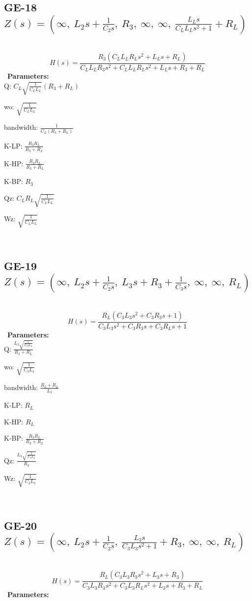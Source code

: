 \documentclass{article}
\begin{document}
\subsection{GE-18 $Z(s) = \left( \infty, \  L_{2} s + \frac{1}{C_{2} s}, \  R_{3}, \  \infty, \  \infty, \  \frac{L_{L} s}{C_{L} L_{L} s^{2} + 1} + R_{L}\right)$ } \ 
\textbf{\[H(s) = \frac{R_{3} \left(C_{L} L_{L} R_{L} s^{2} + L_{L} s + R_{L}\right)}{C_{L} L_{L} R_{3} s^{2} + C_{L} L_{L} R_{L} s^{2} + L_{L} s + R_{3} + R_{L}}\] } \ 
\textbf{Parameters:}\\ 

Q: $C_{L} \sqrt{\frac{1}{C_{L} L_{L}}} \left(R_{3} + R_{L}\right)$\ 

wo: $\sqrt{\frac{1}{C_{L} L_{L}}}$\ 

bandwidth: $\frac{1}{C_{L} \left(R_{3} + R_{L}\right)}$\ 

K-LP: $\frac{R_{3} R_{L}}{R_{3} + R_{L}}$\ 

K-HP: $\frac{R_{3} R_{L}}{R_{3} + R_{L}}$\ 

K-BP: $R_{3}$\ 

Qz: $C_{L} R_{L} \sqrt{\frac{1}{C_{L} L_{L}}}$\ 

Wz: $\sqrt{\frac{1}{C_{L} L_{L}}}$\ 

\ 

\subsection{GE-19 $Z(s) = \left( \infty, \  L_{2} s + \frac{1}{C_{2} s}, \  L_{3} s + R_{3} + \frac{1}{C_{3} s}, \  \infty, \  \infty, \  R_{L}\right)$ } \ 
\textbf{\[H(s) = \frac{R_{L} \left(C_{3} L_{3} s^{2} + C_{3} R_{3} s + 1\right)}{C_{3} L_{3} s^{2} + C_{3} R_{3} s + C_{3} R_{L} s + 1}\] } \ 
\textbf{Parameters:}\\ 

Q: $\frac{L_{3} \sqrt{\frac{1}{C_{3} L_{3}}}}{R_{3} + R_{L}}$\ 

wo: $\sqrt{\frac{1}{C_{3} L_{3}}}$\ 

bandwidth: $\frac{R_{3} + R_{L}}{L_{3}}$\ 

K-LP: $R_{L}$\ 

K-HP: $R_{L}$\ 

K-BP: $\frac{R_{3} R_{L}}{R_{3} + R_{L}}$\ 

Qz: $\frac{L_{3} \sqrt{\frac{1}{C_{3} L_{3}}}}{R_{3}}$\ 

Wz: $\sqrt{\frac{1}{C_{3} L_{3}}}$\ 

\ 

\subsection{GE-20 $Z(s) = \left( \infty, \  L_{2} s + \frac{1}{C_{2} s}, \  \frac{L_{3} s}{C_{3} L_{3} s^{2} + 1} + R_{3}, \  \infty, \  \infty, \  R_{L}\right)$ } \ 
\textbf{\[H(s) = \frac{R_{L} \left(C_{3} L_{3} R_{3} s^{2} + L_{3} s + R_{3}\right)}{C_{3} L_{3} R_{3} s^{2} + C_{3} L_{3} R_{L} s^{2} + L_{3} s + R_{3} + R_{L}}\] } \ 
\textbf{Parameters:}\\ 
\end{document}
